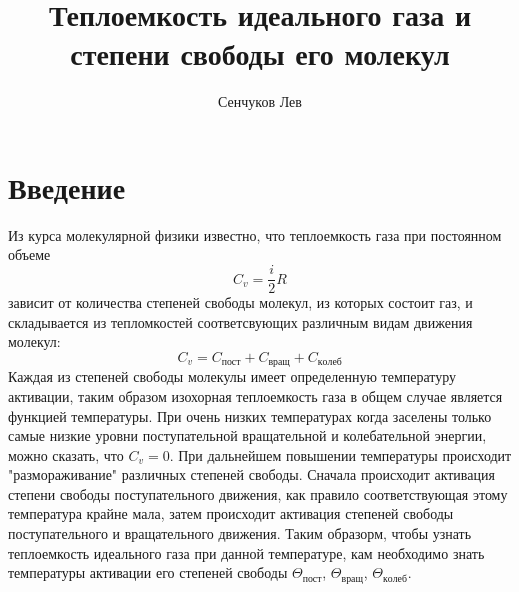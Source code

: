 \documentclass{article}
\title{Теплоемкость идеального газа и степени свободы его молекул}
\author{Сенчуков Лев}
\begin{document}
  \maketitle
  \newpage
  
  

\section{Введение}
Из курса молекулярной физики известно, что теплоемкость газа при постоянном объеме
   \begin{equation*}
C_v =\frac {i}{2} R
  \end{equation*} 
зависит от количества степеней свободы молекул, из которых состоит газ, и складывается из тепломкостей соответсвующих различным видам движения молекул:
   \begin{equation*}
C_v = C_{пост} + C_{вращ} + C_{колеб}
  \end{equation*} 
Каждая из степеней свободы молекулы имеет определенную температуру активации, таким образом изохорная теплоемкость газа в общем случае является функцией температуры. При очень низких температурах когда заселены только самые низкие уровни поступательной вращательной и колебательной энергии, можно сказать, что $C_v = 0$. При дальнейшем повышении температуры происходит "размораживание" различных степеней свободы. Сначала происходит активация степени свободы поступательного движения, как правило соответствующая этому температура крайне мала, затем происходит активация степеней свободы поступательного и вращательного движения. Таким образорм, чтобы узнать теплоемкость идеального газа при данной температуре, кам необходимо знать температуры активации его степеней свободы $\Theta_{пост}$, $\Theta_{вращ}$, $\Theta_{колеб}$.
\end{document}
